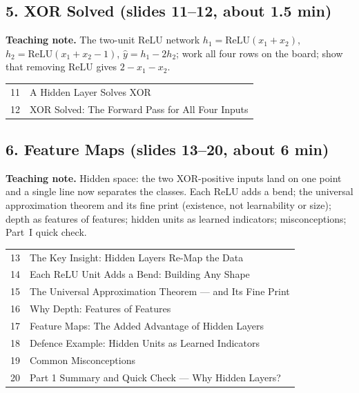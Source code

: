 \documentclass[11pt]{article}
\begin{document}
\subsection{5. XOR Solved \normalfont\small\color{GreyN}(slides 11--12, about 1.5 min)}

\textbf{Teaching note.} The two-unit ReLU network $h_1=\text{ReLU}(x_1+x_2)$, $h_2=\text{ReLU}(x_1+x_2-1)$, $\hat y=h_1-2h_2$; work all four rows on the board; show that removing ReLU gives $2-x_1-x_2$.

\begin{center}\small\renewcommand{\arraystretch}{1.1}\begin{tabularx}{\textwidth}{@{}r X@{}}11 & A Hidden Layer Solves XOR\\
12 & XOR Solved: The Forward Pass for All Four Inputs\\\end{tabularx}\end{center}

\subsection{6. Feature Maps \normalfont\small\color{GreyN}(slides 13--20, about 6 min)}

\textbf{Teaching note.} Hidden space: the two XOR-positive inputs land on one point and a single line now separates the classes. Each ReLU adds a bend; the universal approximation theorem and its fine print (existence, not learnability or size); depth as features of features; hidden units as learned indicators; misconceptions; Part~I quick check.

\begin{center}\small\renewcommand{\arraystretch}{1.1}\begin{tabularx}{\textwidth}{@{}r X@{}}13 & The Key Insight: Hidden Layers Re-Map the Data\\
14 & Each ReLU Unit Adds a Bend: Building Any Shape\\
15 & The Universal Approximation Theorem --- and Its Fine Print\\
16 & Why Depth: Features of Features\\
17 & Feature Maps: The Added Advantage of Hidden Layers\\
18 & Defence Example: Hidden Units as Learned Indicators\\
19 & Common Misconceptions\\
20 & Part 1 Summary and Quick Check --- Why Hidden Layers?\\\end{tabularx}\end{center}
\end{document}

